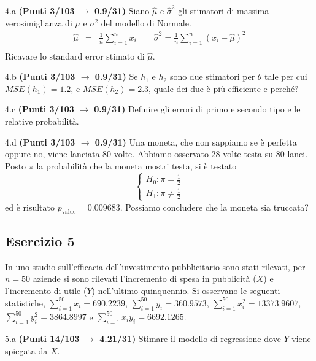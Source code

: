 \documentclass[
  11pt,
]{book}
\theoremstyle{mytheoremstyle}
\theoremstyle{mydefstyle}
\begin{document}
4.a \textbf{(Punti 3/103 \(\rightarrow\) 0.9/31)} Siano \(\hat \mu\) e \(\hat\sigma^2\) gli stimatori di massima verosimiglianza di \(\mu\) e \(\sigma^2\) del modello di Normale.
\begin{eqnarray*}
  \hat\mu &=&  \frac 1n\sum_{i=1}^nx_i \qquad \hat\sigma^2 =  \frac 1n\sum_{i=1}^n(x_i-\hat\mu)^2\\
\end{eqnarray*}
Ricavare lo standard error stimato di \(\hat\mu\).

4.b \textbf{(Punti 3/103 \(\rightarrow\) 0.9/31)} Se \(h_1\) e \(h_2\) sono due stimatori per \(\theta\) tale per cui \(MSE(h_1)=1.2\), e \(MSE(h_2)=2.3\), quale dei due è più efficiente e perché?

4.c \textbf{(Punti 3/103 \(\rightarrow\) 0.9/31)} Definire gli errori di primo e secondo tipo e le relative probabilità.

4.d \textbf{(Punti 3/103 \(\rightarrow\) 0.9/31)} Una moneta, che non sappiamo se è perfetta oppure no, viene lanciata 80 volte. Abbiamo osservato 28 volte testa su 80 lanci. Posto \(\pi\) la probabilità che la moneta mostri testa, si è testato
\[
\begin{cases}
H_0:\pi=\frac 12\\
H_1:\pi\ne\frac 12
\end{cases}
\]
ed è risultato \(p_\text{value}=0.009683\). Possiamo concludere che la moneta sia truccata?

\subsection{Esercizio 5}\label{esercizio-5-23}

In uno studio sull'efficacia dell'investimento pubblicitario sono stati rilevati, per \(n=50\) aziende si sono rilevati l'incremento di spesa in
pubblicità (\(X\)) e l'incremento di utile (\(Y\)) nell'ultimo quinquennio. Si osservano le seguenti statistiche, \(\sum_{i=1}^{50}x_i=690.2239\), \(\sum_{i=1}^{50}y_i=360.9573\),
\(\sum_{i=1}^{50}x_i^2=13373.9607\), \(\sum_{i=1}^{50}y_i^2=3864.8997\) e \(\sum_{i=1}^{50}x_iy_i=6692.1265\).

5.a \textbf{(Punti 14/103 \(\rightarrow\) 4.21/31)} Stimare il modello di regressione dove \(Y\) viene spiegata da \(X\).
\end{document}
